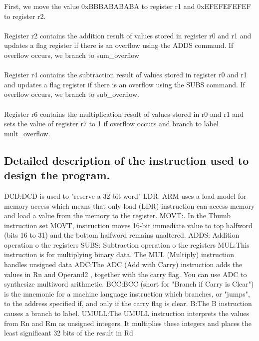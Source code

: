 \documentclass{article}
\begin{document}
First, we move the value 0xBBBABABABA to register r1 and 0xEFEFEFEFEF to register r2.\\\\
    Register r2 contains the addition result of values stored in register r0 and r1 and updates a flag register if there is an overflow using the ADDS command. If overflow occurs, we branch to sum\_overflow\\\\
    Register r4 contains the subtraction result of values stored in register r0 and r1 and updates a flag register if there is an overflow using the SUBS command. If overflow occurs, we branch to sub\_overflow.\\\\
    Register r6 contains the multiplication result of values stored in r0 and r1 and sets the value of register r7 to 1 if overflow occurs and branch to label mult\_overflow.
\subsection{Detailed description of the instruction used to design the program.}

DCD:DCD is used to "reserve a 32 bit word"\newline\newline
LDR: ARM uses a load model for memory access which means that only load (LDR) instruction can access memory and load a value from the memory to the register.\newline\newline
MOVT:. In the Thumb instruction set MOVT, instruction moves 16-bit immediate value to top halfword (bits 16 to 31) and the bottom halfword remains unaltered. \newline\newline
ADDS: Addition operation o the registers\newline\newline
SUBS: Subtraction operation o the registers\newline\newline
MUL:This instruction is for multiplying binary data. The MUL (Multiply) instruction handles unsigned data\newline\newline
ADC:The ADC (Add with Carry) instruction adds the values in Rn and Operand2 , together with the carry flag. You can use ADC to synthesize multiword arithmetic.\newline\newline
BCC:BCC (short for "Branch if Carry is Clear") is the mnemonic for a machine language instruction which branches, or "jumps", to the address specified if, and only if the carry flag is clear.\newline\newline
B:The B instruction causes a branch to label.\newline\newline
UMULL:The UMULL instruction interprets the values from Rn and Rm as unsigned integers. It multiplies these integers and places the least significant 32 bits of the result in Rd\newline
\end{document}
